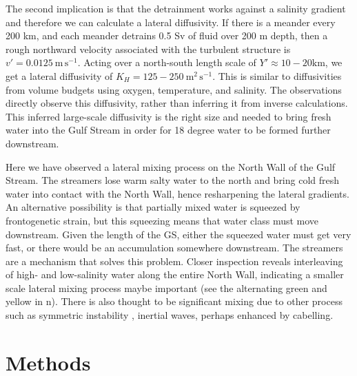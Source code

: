 \documentclass{natureJMK}
\begin{document}
The second implication is that the detrainment works against a salinity gradient and therefore we can calculate a lateral diffusivity.  If there is a meander every 200 km, and each meander detrains 0.5 Sv of fluid over 200 m depth, then a rough northward velocity associated with the turbulent structure is $v'=0.0125\ \mathrm{m\,s^{-1}}$.  Acting over a north-south length scale of $Y'\approx 10-20 \mathrm{km}$, we get a lateral diffusivity of $K_H=125-250\ \mathrm{m^2\,s^{-1}}$.  This is similar to diffusivities from volume budgets using oxygen, temperature, and salinity\cite{boweretal85,joyceetal13}. The observations directly observe this diffusivity, rather than inferring it from inverse calculations. This inferred large-scale diffusivity is the right size and needed to bring fresh water into the Gulf Stream in order for 18 degree water to be formed further downstream.\cite{joyceetal13}

Here we have observed a  lateral mixing process on the North Wall of the Gulf Stream.  The streamers lose warm salty water to the north and bring cold fresh water into contact with the North Wall, hence resharpening the lateral gradients. An alternative possibility is that partially mixed water is squeezed by frontogenetic strain, but this squeezing means that water class must move downstream.  Given the length of the GS, either the squeezed water must get very fast, or there would be an accumulation somewhere downstream. The streamers are a mechanism that solves this problem.   Closer inspection reveals interleaving of high- and low-salinity water along the entire North Wall, indicating a smaller scale lateral mixing process maybe important (see the alternating green and yellow in n).  There is also thought to be significant mixing due to other process such as symmetric instability \cite{thomasetal15}, inertial waves\cite{whittthomas13}, perhaps enhanced by cabelling.  


\section{Methods}
\end{document}
